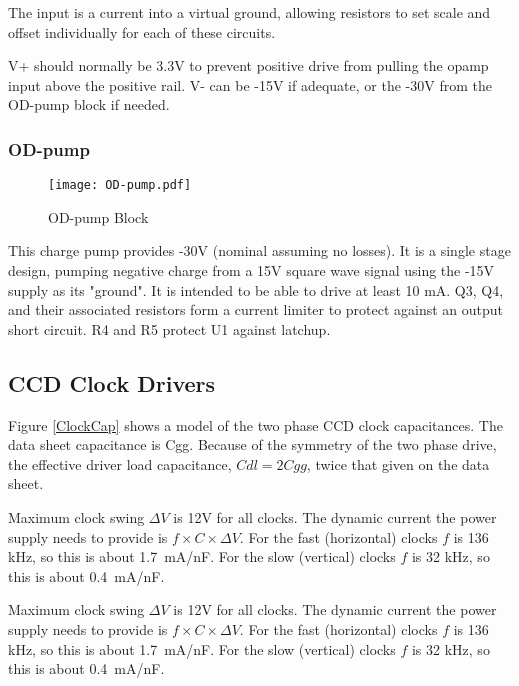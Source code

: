The input is a current into a virtual ground, allowing resistors to set scale and offset individually for each of these circuits.

V+ should normally be 3.3V to prevent positive drive from pulling the opamp input above the positive rail. V- can be -15V if adequate, or the -30V from the OD-pump block if needed.



\subsubsection{OD-pump}

   \begin{figure}
   \begin{center}
   \texttt{[image: OD-pump.pdf]}
   \end{center}
   \caption{OD-pump Block}
   \end{figure}
   
This charge pump provides -30V (nominal assuming no losses). It is a single stage design, pumping negative charge from a 15V square wave signal using the -15V supply as its "ground". It is intended to be able to drive at least 10 mA. Q3, Q4, and their associated resistors form a current limiter to protect against an output short circuit. R4 and R5 protect U1 against latchup.



\pagebreak
\subsection{CCD Clock Drivers}
\label{ClockDrivers}
Figure \ref{ClockCap} shows a model of the two phase CCD clock capacitances. The data sheet capacitance is Cgg.  Because of the symmetry of the two phase drive, the effective driver load capacitance, $Cdl=2Cgg$, twice that given on the data sheet.

Maximum clock swing $\Delta V$ is 12V for all clocks. The dynamic current the power supply needs to provide is $f\times C \times \Delta V$. For the fast (horizontal) clocks $f$ is 136 kHz, so this is about 1.7\ mA/nF. For the slow (vertical) clocks $f$ is 32 kHz, so this is about 0.4\ mA/nF.

Maximum clock swing $\Delta V$ is 12V for all clocks. The dynamic current the power supply needs to provide is $f\times C \times \Delta V$. For the fast (horizontal) clocks $f$ is 136 kHz, so this is about 1.7\ mA/nF. For the slow (vertical) clocks $f$ is 32 kHz, so this is about 0.4\ mA/nF.

